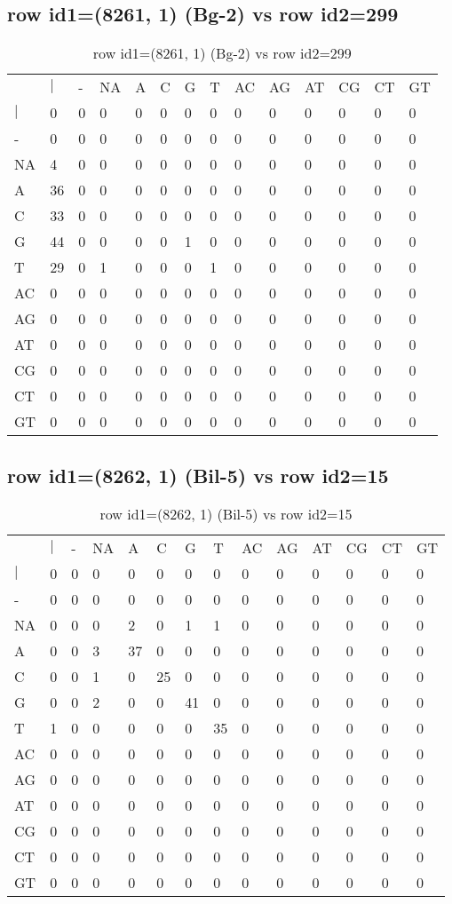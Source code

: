 \subsection{row id1=(8261, 1) (Bg-2) vs row id2=299}
\begin{center}
\begin{longtable}{|l|l|l|l|l|l|l|l|l|l|l|l|l|l|}
\caption{row id1=(8261, 1) (Bg-2) vs row id2=299} \label{table_dm404}\\
\hline
\\
\hline
&$|$&-&NA&A&C&G&T&AC&AG&AT&CG&CT&GT\\
$|$&0&0&0&0&0&0&0&0&0&0&0&0&0\\
-&0&0&0&0&0&0&0&0&0&0&0&0&0\\
NA&4&0&0&0&0&0&0&0&0&0&0&0&0\\
A&36&0&0&0&0&0&0&0&0&0&0&0&0\\
C&33&0&0&0&0&0&0&0&0&0&0&0&0\\
G&44&0&0&0&0&1&0&0&0&0&0&0&0\\
T&29&0&1&0&0&0&1&0&0&0&0&0&0\\
AC&0&0&0&0&0&0&0&0&0&0&0&0&0\\
AG&0&0&0&0&0&0&0&0&0&0&0&0&0\\
AT&0&0&0&0&0&0&0&0&0&0&0&0&0\\
CG&0&0&0&0&0&0&0&0&0&0&0&0&0\\
CT&0&0&0&0&0&0&0&0&0&0&0&0&0\\
GT&0&0&0&0&0&0&0&0&0&0&0&0&0\\
\hline
\end{longtable}
\end{center}

\subsection{row id1=(8262, 1) (Bil-5) vs row id2=15}
\begin{center}
\begin{longtable}{|l|l|l|l|l|l|l|l|l|l|l|l|l|l|}
\caption{row id1=(8262, 1) (Bil-5) vs row id2=15} \label{table_dm406}\\
\hline
\\
\hline
&$|$&-&NA&A&C&G&T&AC&AG&AT&CG&CT&GT\\
$|$&0&0&0&0&0&0&0&0&0&0&0&0&0\\
-&0&0&0&0&0&0&0&0&0&0&0&0&0\\
NA&0&0&0&2&0&1&1&0&0&0&0&0&0\\
A&0&0&3&37&0&0&0&0&0&0&0&0&0\\
C&0&0&1&0&25&0&0&0&0&0&0&0&0\\
G&0&0&2&0&0&41&0&0&0&0&0&0&0\\
T&1&0&0&0&0&0&35&0&0&0&0&0&0\\
AC&0&0&0&0&0&0&0&0&0&0&0&0&0\\
AG&0&0&0&0&0&0&0&0&0&0&0&0&0\\
AT&0&0&0&0&0&0&0&0&0&0&0&0&0\\
CG&0&0&0&0&0&0&0&0&0&0&0&0&0\\
CT&0&0&0&0&0&0&0&0&0&0&0&0&0\\
GT&0&0&0&0&0&0&0&0&0&0&0&0&0\\
\hline
\end{longtable}
\end{center}

